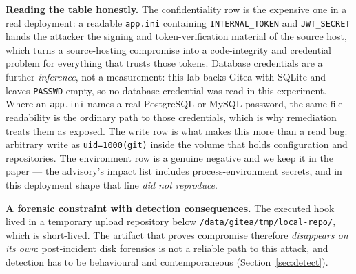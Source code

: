 \textbf{Reading the table honestly.} The confidentiality row is the expensive
one in a real deployment: a readable \texttt{app.ini} containing
\texttt{INTERNAL\_TOKEN} and \texttt{JWT\_SECRET} hands the attacker the signing and
token-verification material of the source host, which turns a source-hosting
compromise into a code-integrity and credential problem for everything that trusts
those tokens. Database credentials are a further \emph{inference}, not a measurement:
this lab backs Gitea with SQLite and leaves \texttt{PASSWD} empty, so no database
credential was read in this experiment. Where an \texttt{app.ini} names a real
PostgreSQL or MySQL password, the same file readability is the ordinary path to those
credentials, which is why remediation treats them as exposed. The write row is
what makes this more than a read bug: arbitrary write as \texttt{uid=1000(git)}
inside the volume that holds configuration and repositories. The environment row
is a genuine negative and we keep it in the paper --- the advisory's impact list
includes process-environment secrets, and in this deployment shape that line
\emph{did not reproduce}.

\textbf{A forensic constraint with detection consequences.} The executed hook
lived in a temporary upload repository below
\texttt{/data/gitea/tmp/local-repo/}, which is short-lived. The artifact that
proves compromise therefore \emph{disappears on its own}: post-incident disk
forensics is not a reliable path to this attack, and detection has to be
behavioural and contemporaneous (Section~\ref{sec:detect}).
